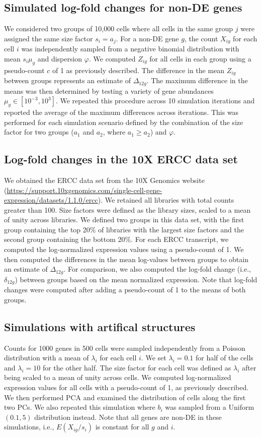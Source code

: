 \documentclass[10pt,letterpaper]{article}
\begin{document}
\subsection{Simulated log-fold changes for non-DE genes}
We considered two groups of 10,000 cells where all cells in the same group $j$ were assigned the same size factor $s_i=a_j$.
For a non-DE gene $g$, the count $X_{ig}$ for each cell $i$ was independently sampled from a negative binomial distribution with mean $s_i\mu_g$ and dispersion $\varphi$.
We computed $Z_{ig}$ for all cells in each group using a pseudo-count $c$ of 1 as previously described.
The difference in the mean $Z_{ig}$ between groups represents an estimate of $\Delta_{12g}$.
The maximum difference in the means was then determined by testing a variety of gene abundances $\mu_g \in [10^{-3}, 10^3]$.
We repeated this procedure across 10 simulation iterations and reported the average of the maximum differences across iterations.
This was performed for each simulation scenario defined by the combination of the size factor for two groups ($a_1$ and $a_2$, where $a_1 \ge a_2$) and $\varphi$.

\subsection{Log-fold changes in the 10X ERCC data set}
We obtained the ERCC data set from the 10X Genomics website (\url{https://support.10xgenomics.com/single-cell-gene-expression/datasets/1.1.0/ercc}).
We retained all libraries with total counts greater than 100.
Size factors were defined as the library sizes, scaled to a mean of unity across libraries.
We defined two groups in this data set, with the first group containing the top 20\% of libraries with the largest size factors and the second group containing the bottom 20\%.
For each ERCC transcript, we computed the log-normalized expression values using a pseudo-count of 1.
We then computed the differences in the mean log-values between groups to obtain an estimate of $\Delta_{12g}$.
For comparison, we also computed the log-fold change (i.e., $\delta_{12g}$) between groups based on the mean normalized expression.
Note that log-fold changes were computed after adding a pseudo-count of 1 to the means of both groups.

\subsection{Simulations with artifical structures}
Counts for 1000 genes in 500 cells were sampled independently from a Poisson distribution with a mean of $\lambda_i$ for each cell $i$. 
We set $\lambda_i=0.1$ for half of the cells and $\lambda_i=10$ for the other half.
The size factor for each cell was defined as $\lambda_i$ after being scaled to a mean of unity across cells.
We computed log-normalized expression values for all cells with a pseudo-count of 1, as previously described.
We then performed PCA and examined the distribution of cells along the first two PCs.
We also repeated this simulation where $b_i$ was sampled from a Uniform$(0.1, 5)$ distribution instead.
Note that all genes are non-DE in these simulations, i.e., $E(X_{ig}/s_i)$ is constant for all $g$ and $i$.
\end{document}
